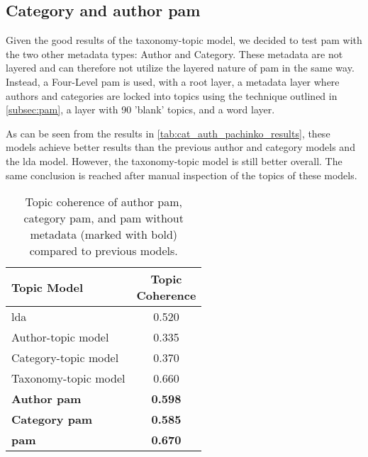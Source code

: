 \subsection{Category and author \gls{pam}}\label{app:cat_auth_pachinko}
Given the good results of the taxonomy-topic model, we decided to test \gls{pam} with the two other metadata types: Author and Category.
These metadata are not layered and can therefore not utilize the layered nature of \gls{pam} in the same way.
Instead, a Four-Level \gls{pam} is used, with a root layer, a metadata layer where authors and categories are locked into topics using the technique outlined in \autoref{subsec:pam}, a layer with 90 'blank' topics, and a word layer.

As can be seen from the results in \autoref{tab:cat_auth_pachinko_results}, these models achieve better results than the previous author and category models and the \gls{lda} model.
However, the taxonomy-topic model is still better overall.
The same conclusion is reached after manual inspection of the topics of these models.

\begin{table}[h]
	\centering
	\caption{Topic coherence of author \gls{pam}, category \gls{pam}, and \gls{pam} without metadata (marked with bold) compared to previous models.}
	\begin{tabular}{l|c}
		Topic Model & \makecell{Topic \\ Coherence} \\
		\midrule
		\Acrlong{lda} & 0.520 \\
		Author-topic model & 0.335 \\
		Category-topic model & 0.370 \\
		Taxonomy-topic model & 0.660 \\
		\textbf{Author \gls{pam}} & \textbf{0.598} \\
		\textbf{Category \gls{pam}} & \textbf{0.585} \\
		\textbf{\Acrlong{pam}} & \textbf{0.670} \\
	\end{tabular}
	\label{tab:cat_auth_pachinko_results}
\end{table}

